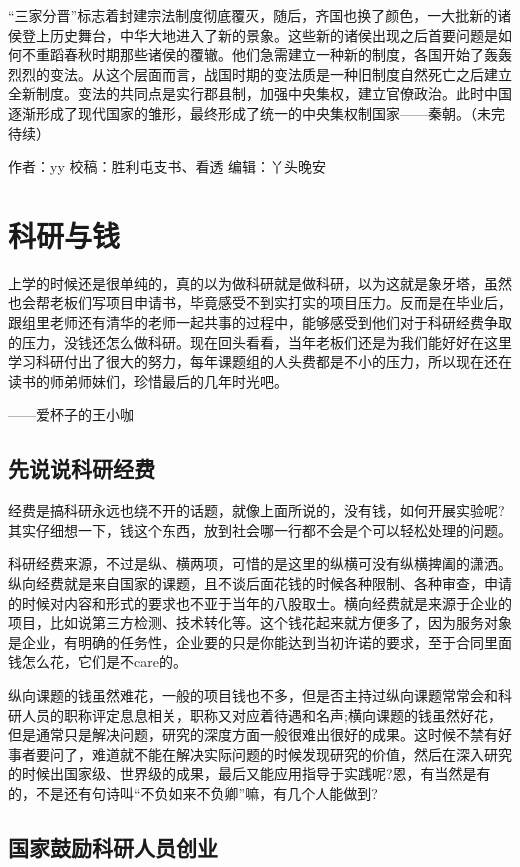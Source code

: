\documentclass[]{book}
\begin{document}
``三家分晋''标志着封建宗法制度彻底覆灭，随后，齐国也换了颜色，一大批新的诸侯登上历史舞台，中华大地进入了新的景象。这些新的诸侯出现之后首要问题是如何不重蹈春秋时期那些诸侯的覆辙。他们急需建立一种新的制度，各国开始了轰轰烈烈的变法。从这个层面而言，战国时期的变法质是一种旧制度自然死亡之后建立全新制度。变法的共同点是实行郡县制，加强中央集权，建立官僚政治。此时中国逐渐形成了现代国家的雏形，最终形成了统一的中央集权制国家------秦朝。（未完待续）

作者：yy 校稿：胜利屯支书、看透 编辑：丫头晚安

\section{科研与钱}

上学的时候还是很单纯的，真的以为做科研就是做科研，以为这就是象牙塔，虽然也会帮老板们写项目申请书，毕竟感受不到实打实的项目压力。反而是在毕业后，跟组里老师还有清华的老师一起共事的过程中，能够感受到他们对于科研经费争取的压力，没钱还怎么做科研。现在回头看看，当年老板们还是为我们能好好在这里学习科研付出了很大的努力，每年课题组的人头费都是不小的压力，所以现在还在读书的师弟师妹们，珍惜最后的几年时光吧。

------爱杯子的王小咖

\subsection{先说说科研经费}

经费是搞科研永远也绕不开的话题，就像上面所说的，没有钱，如何开展实验呢?其实仔细想一下，钱这个东西，放到社会哪一行都不会是个可以轻松处理的问题。

科研经费来源，不过是纵、横两项，可惜的是这里的纵横可没有纵横捭阖的潇洒。纵向经费就是来自国家的课题，且不谈后面花钱的时候各种限制、各种审查，申请的时候对内容和形式的要求也不亚于当年的八股取士。横向经费就是来源于企业的项目，比如说第三方检测、技术转化等。这个钱花起来就方便多了，因为服务对象是企业，有明确的任务性，企业要的只是你能达到当初许诺的要求，至于合同里面钱怎么花，它们是不care的。

纵向课题的钱虽然难花，一般的项目钱也不多，但是否主持过纵向课题常常会和科研人员的职称评定息息相关，职称又对应着待遇和名声;横向课题的钱虽然好花，但是通常只是解决问题，研究的深度方面一般很难出很好的成果。这时候不禁有好事者要问了，难道就不能在解决实际问题的时候发现研究的价值，然后在深入研究的时候出国家级、世界级的成果，最后又能应用指导于实践呢?恩，有当然是有的，不是还有句诗叫``不负如来不负卿''嘛，有几个人能做到?

\subsection{国家鼓励科研人员创业}
\end{document}
